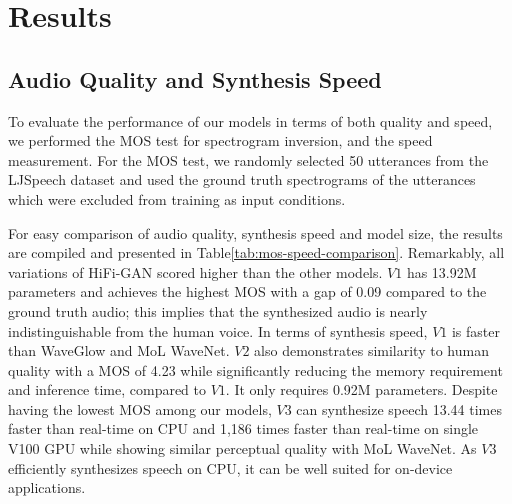 \section{Results}

\subsection{Audio Quality and Synthesis Speed}
\label{sec_fidelity_speed}
To evaluate the performance of our models in terms of both quality and speed, 
we performed the MOS test for spectrogram inversion, and the speed measurement. For the MOS test, we randomly selected 50 utterances from the LJSpeech dataset and used the ground truth spectrograms of the utterances which were excluded from training as input conditions.


\par For easy comparison of audio quality, synthesis speed and model size, the results are compiled and presented in Table\ref{tab:mos-speed-comparison}. Remarkably, all variations of HiFi-GAN scored higher than the other models. $V1$ has 13.92M parameters and achieves the highest MOS with a gap of 0.09 compared to the ground truth audio; this implies that the synthesized audio is nearly indistinguishable from the human voice. In terms of synthesis speed, $V1$ is faster than WaveGlow and MoL WaveNet. $V2$ also demonstrates similarity to human quality with a MOS of 4.23 while significantly reducing the memory requirement and inference time, compared to $V1$. It only requires 0.92M parameters. Despite having the lowest MOS among our models, $V3$ can synthesize speech 13.44 times faster than real-time on CPU and 1,186 times faster than real-time on single V100 GPU while showing similar perceptual quality with MoL WaveNet. As $V3$ efficiently synthesizes speech on CPU, it can be well suited for on-device applications.

